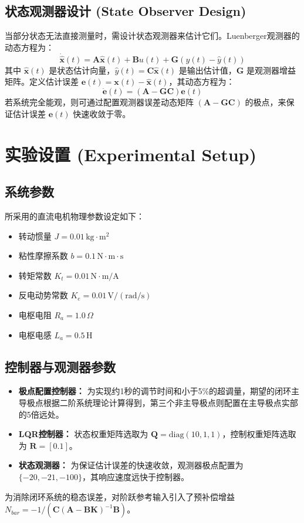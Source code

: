 \documentclass[12pt, a4paper]{article}
\begin{document}
\subsection{状态观测器设计 (State Observer Design)}
当部分状态无法直接测量时，需设计状态观测器来估计它们。Luenberger观测器的动态方程为：
\begin{equation}
    \dot{\hat{\bm{x}}}(t) = \bm{A}\hat{\bm{x}}(t) + \bm{B}u(t) + \bm{G}(y(t) - \hat{y}(t))
    \label{eq:observer}
\end{equation}
其中 $\hat{\bm{x}}(t)$ 是状态估计向量，$\hat{y}(t) = \bm{C}\hat{\bm{x}}(t)$ 是输出估计值，$\bm{G}$ 是观测器增益矩阵。定义估计误差 $\bm{e}(t) = \bm{x}(t) - \hat{\bm{x}}(t)$，其动态方程为：
\begin{equation}
    \dot{\bm{e}}(t) = (\bm{A} - \bm{G}\bm{C})\bm{e}(t)
    \label{eq:observer_error}
\end{equation}
若系统完全能观，则可通过配置观测器误差动态矩阵 $(\bm{A} - \bm{G}\bm{C})$ 的极点，来保证估计误差 $\bm{e}(t)$ 快速收敛于零。

\section{实验设置 (Experimental Setup)}

\subsection{系统参数}
所采用的直流电机物理参数设定如下：
\begin{itemize}
    \item 转动惯量 $J = 0.01 \, \mathrm{kg \cdot m^2}$
    \item 粘性摩擦系数 $b = 0.1 \, \mathrm{N \cdot m \cdot s}$
    \item 转矩常数 $K_t = 0.01 \, \mathrm{N \cdot m / A}$
    \item 反电动势常数 $K_e = 0.01 \, \mathrm{V / (rad/s)}$
    \item 电枢电阻 $R_a = 1.0 \, \Omega$
    \item 电枢电感 $L_a = 0.5 \, \mathrm{H}$
\end{itemize}

\subsection{控制器与观测器参数}
\begin{itemize}
    \item \textbf{极点配置控制器：} 为实现约1秒的调节时间和小于5\%的超调量，期望的闭环主导极点根据二阶系统理论计算得到，第三个非主导极点则配置在主导极点实部的5倍远处。
    \item \textbf{LQR控制器：} 状态权重矩阵选取为 $\bm{Q} = \mathrm{diag}(10, 1, 1)$，控制权重矩阵选取为 $\bm{R} = [0.1]$。
    \item \textbf{状态观测器：} 为保证估计误差的快速收敛，观测器极点配置为 $\{-20, -21, -100\}$，其响应速度远快于控制器。
\end{itemize}
为消除闭环系统的稳态误差，对阶跃参考输入引入了预补偿增益 $N_{bar} = -1 / (\bm{C}(\bm{A}-\bm{B}\bm{K})^{-1}\bm{B})$。
\end{document}
